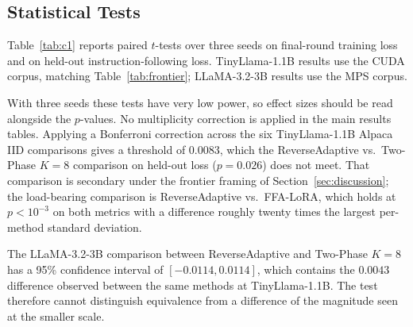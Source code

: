 \documentclass[iicol,pdflatex,sn-mathphys-num]{sn-jnl}
\begin{document}
\begin{appendices}
\section{Statistical Tests}
\label{app:stats}
Table~\ref{tab:c1} reports paired $t$-tests over three seeds on final-round training loss and on held-out instruction-following loss. TinyLlama-1.1B results use the CUDA corpus, matching Table~\ref{tab:frontier}; LLaMA-3.2-3B results use the MPS corpus.

With three seeds these tests have very low power, so effect sizes should be read alongside the $p$-values. No multiplicity correction is applied in the main results tables. Applying a Bonferroni correction across the six TinyLlama-1.1B Alpaca IID comparisons gives a threshold of $0.0083$, which the ReverseAdaptive vs.\ Two-Phase $K{=}8$ comparison on held-out loss ($p = 0.026$) does not meet. That comparison is secondary under the frontier framing of Section~\ref{sec:discussion}; the load-bearing comparison is ReverseAdaptive vs.\ FFA-LoRA, which holds at $p < 10^{-3}$ on both metrics with a difference roughly twenty times the largest per-method standard deviation.

The LLaMA-3.2-3B comparison between ReverseAdaptive and Two-Phase $K{=}8$ has a 95\% confidence interval of $[{-}0.0114, 0.0114]$, which contains the $0.0043$ difference observed between the same methods at TinyLlama-1.1B. The test therefore cannot distinguish equivalence from a difference of the magnitude seen at the smaller scale.


\end{appendices}
\end{document}
